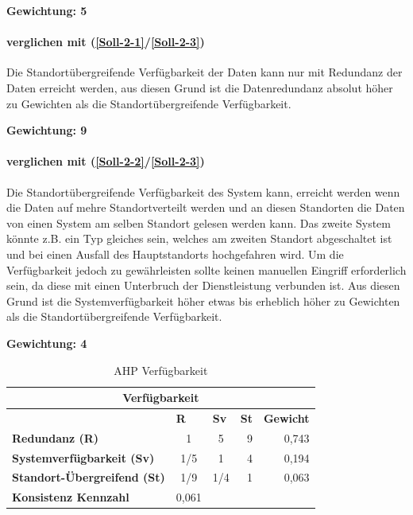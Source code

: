 \textbf{Gewichtung: 5}

\paragraph*{ verglichen mit  (\ref{Soll-2-1}/\ref{Soll-2-3})}
Die Standortübergreifende Verfügbarkeit der Daten kann nur mit Redundanz der Daten erreicht werden, aus diesen Grund ist die Datenredundanz absolut höher zu Gewichten als die Standortübergreifende Verfügbarkeit.

\textbf{Gewichtung: 9}

\paragraph*{ verglichen mit  (\ref{Soll-2-2}/\ref{Soll-2-3})}
Die Standortübergreifende Verfügbarkeit des System kann, erreicht werden wenn die Daten auf mehre Standortverteilt werden und an diesen Standorten die Daten von einen System am selben Standort gelesen werden kann. Das zweite System könnte z.B. ein Typ gleiches sein, welches am zweiten Standort abgeschaltet ist und bei einen Ausfall des Hauptstandorts hochgefahren wird.
Um die Verfügbarkeit jedoch zu gewährleisten sollte keinen manuellen Eingriff erforderlich sein, da diese mit einen Unterbruch der Dienstleistung verbunden ist. Aus diesen Grund ist die Systemverfügbarkeit höher etwas bis erheblich höher zu Gewichten als die Standortübergreifende Verfügbarkeit.

\textbf{Gewichtung: 4}

\begin{table}[htbp]
\caption{AHP Verfügbarkeit}
\begin{tabular}{|l|c|c|c|l|}
\hline
\multicolumn{ 5}{|c|}{\textbf{Verfügbarkeit}} \\ \hline
 & \multicolumn{1}{l|}{\textbf{R}} & \multicolumn{1}{l|}{\textbf{Sv}} & \textbf{St} & \textbf{Gewicht} \\ \hline
\textbf{Redundanz (R)} & 1 & 5 & \multicolumn{1}{r|}{9} & \multicolumn{1}{r|}{0,743} \\ \hline
\textbf{Systemverfügbarkeit (Sv)} & 1/5 & 1 & \multicolumn{1}{r|}{4} & \multicolumn{1}{r|}{0,194} \\ \hline
\textbf{Standort-Übergreifend (St)} & 1/9 & 1/4 & \multicolumn{1}{r|}{1} & \multicolumn{1}{r|}{0,063} \\ \hline
\textbf{Konsistenz Kennzahl} & 0,061 \\ \cline{1-2}
\end{tabular}
\label{tab:AHPVerfügbarkeit}
\end{table}


